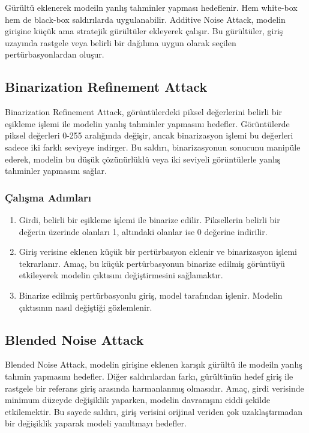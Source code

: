 Gürültü eklenerek modeiln yanlış tahminler yapması hedeflenir. Hem white-box hem de black-box saldırılarda uygulanabilir. Additive Noise Attack, modelin girişine küçük ama stratejik gürültüler ekleyerek çalışır. Bu gürültüler, giriş uzayında rastgele veya belirli bir dağılıma uygun olarak seçilen pertürbasyonlardan oluşur.

\newpage

\subsection{Binarization Refinement Attack}

Binarization Refinement Attack, görüntülerdeki piksel değerlerini belirli bir eşikleme işlemi ile modelin yanlış tahminler yapmasını hedefler. Görüntülerde piksel değerleri 0-255 aralığında değişir, ancak binarizasyon işlemi bu değerleri sadece iki farklı seviyeye indirger. Bu saldırı, binarizasyonun sonucunu manipüle ederek, modelin bu düşük çözünürlüklü veya iki seviyeli görüntülerle yanlış tahminler yapmasını sağlar. 

\subsubsection{Çalışma Adımları}

\begin{enumerate}
    \item Girdi, belirli bir eşikleme işlemi ile binarize edilir. Piksellerin belirli bir değerin üzerinde olanları 1, altındaki olanlar ise 0 değerine indirilir.
    \item Giriş verisine eklenen küçük bir pertürbasyon eklenir ve binarizasyon işlemi tekrarlanır. Amaç, bu küçük pertürbasyonun binarize edilmiş görüntüyü etkileyerek modelin çıktısını değiştirmesini sağlamaktır.
    \item Binarize edilmiş pertürbasyonlu giriş, model tarafından işlenir. Modelin çıktısının nasıl değiştiği gözlemlenir.
\end{enumerate}

\newpage

\subsection{Blended Noise Attack}

Blended Noise Attack, modelin girişine eklenen karışık gürültü ile modeiln yanlış tahmin yapmasını hedefler. Diğer saldırılardan farkı, gürültünün hedef giriş ile rastgele bir referans giriş arasında harmanlanmış olmasıdır. Amaç, girdi verisinde minimum düzeyde değişiklik yaparken, modelin davranışını ciddi şekilde etkilemektir. Bu sayede saldırı, giriş verisini orijinal veriden çok uzaklaştırmadan bir değişiklik yaparak modeli yanıltmayı hedefler. 

